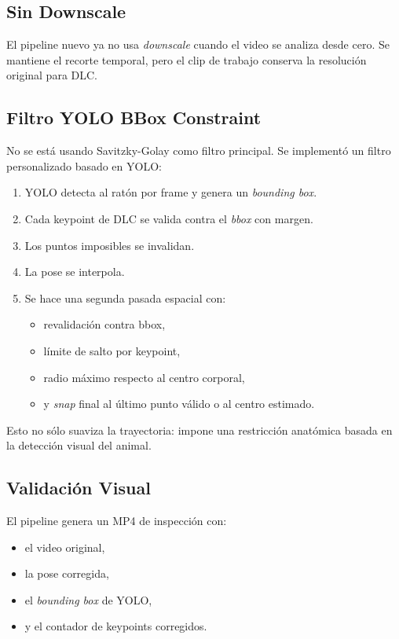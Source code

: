 \documentclass[12pt,a4paper]{article}
\begin{document}
\subsection{Sin Downscale}
El pipeline nuevo ya no usa \textit{downscale} cuando el video se analiza desde cero. Se mantiene el recorte temporal, pero el clip de trabajo conserva la resoluci\'on original para DLC.

\subsection{Filtro YOLO BBox Constraint}
No se est\'a usando Savitzky-Golay como filtro principal. Se implement\'o un filtro personalizado basado en YOLO:
\begin{enumerate}[leftmargin=1.5cm]
    \item YOLO detecta al rat\'on por frame y genera un \textit{bounding box}.
    \item Cada keypoint de DLC se valida contra el \textit{bbox} con margen.
    \item Los puntos imposibles se invalidan.
    \item La pose se interpola.
    \item Se hace una segunda pasada espacial con:
    \begin{itemize}[leftmargin=1.5cm]
        \item revalidaci\'on contra bbox,
        \item l\'imite de salto por keypoint,
        \item radio m\'aximo respecto al centro corporal,
        \item y \textit{snap} final al \'ultimo punto v\'alido o al centro estimado.
    \end{itemize}
\end{enumerate}

Esto no s\'olo suaviza la trayectoria: impone una restricci\'on anat\'omica basada en la detecci\'on visual del animal.

\subsection{Validaci\'on Visual}
El pipeline genera un MP4 de inspecci\'on con:
\begin{itemize}[leftmargin=1.5cm]
    \item el video original,
    \item la pose corregida,
    \item el \textit{bounding box} de YOLO,
    \item y el contador de keypoints corregidos.
\end{itemize}
\end{document}
